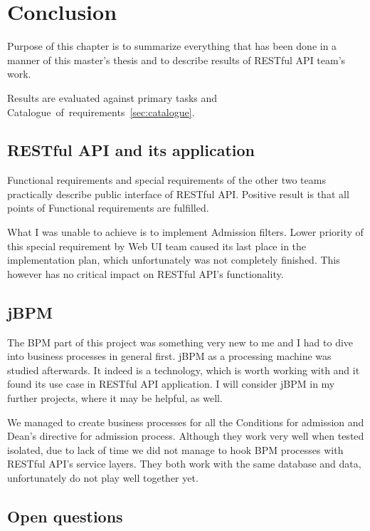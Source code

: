 \chapter{Conclusion}\label{cha:conclusion}

	Purpose of this chapter is to summarize everything that has been done in a manner of this master's thesis and to
	describe results of RESTful API team's work.
	
	Results are evaluated against primary tasks and Catalogue~of~requirements~\ref{sec:catalogue}.
	
	\section{RESTful API and its application}
	
	Functional requirements and special requirements of the other two teams practically describe public interface of
	RESTful API.
	Positive result is that all points of Functional requirements are fulfilled.
	
	What I was unable to achieve is to implement Admission filters. Lower priority of this special requirement by Web UI
	team caused its last place in the implementation plan, which unfortunately was not completely finished. This however
	has no critical impact on RESTful API's functionality.
		
	\section{jBPM}
	
	The \gls{BPM} part of this project was something very new to me and I had to dive into business processes in general
	first. jBPM as a processing machine was studied afterwards. It indeed is a technology, which is worth working with
	and it found its use case in RESTful API application. I will consider jBPM in my further projects, where it may be
	helpful, as well.
	
	We managed to create business processes for all the Conditions for admission and Dean's directive for admission
	process. Although they work very well when tested isolated, due to lack of time we did not manage to hook BPM processes
	with RESTful API's service layers. They both work with the same database and data, unfortunately do not play well
	together yet.
	
	\section{Open questions}
	

